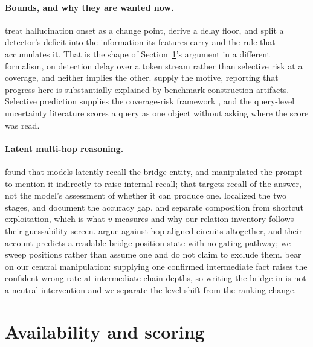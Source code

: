 \documentclass{article}
\begin{document}
\paragraph{Bounds, and why they are wanted now.} \citet{quickest2026onset} treat hallucination onset
as a change point, derive a delay floor, and split a detector's deficit into the information its
features carry and the rule that accumulates it. That is the shape of Section~\ref{sec:theory}'s
argument in a different formalism, on detection delay over a token stream rather than selective risk
at a coverage, and neither implies the other. \citet{hussain2026parallax} supply the motive, reporting
that progress here is substantially explained by benchmark construction artifacts. Selective
prediction supplies the coverage-risk framework
\citep{elyaniv2010foundations,geifman2017selective,chow1970optimum}, and the query-level uncertainty
literature
\citep{kadavath2022know,azaria2023internal,burns2023discovering,chen2024inside,ji2024internal,gottesman2024estimating,kossen2024semantic,chen2026querylevel,wen2025abstention,yao2025seakr}
scores a query as one object without asking where the score was read.

\paragraph{Latent multi-hop reasoning.} \citet{yang2024latent} found that models latently recall the
bridge entity, and manipulated the prompt to mention it indirectly to raise internal recall; that
targets recall of the answer, not the model's assessment of whether it can produce one.
\citet{biran2024hopping} localized the two stages, \citet{balesni2024twohop} and
\citet{press2023compositionality} document the accuracy gap, and \citet{yang2024shortcuts} separate
composition from shortcut exploitation, which is what $v$ measures and why our relation inventory
follows their guessability screen. \citet{layerorder2026} argue against hop-aligned circuits
altogether, and their account predicts a readable bridge-position state with no gating pathway; we
sweep positions rather than assume one and do not claim to exclude them.
\citet{lathkar2026anchored} bear on our central manipulation: supplying one confirmed intermediate
fact raises the confident-wrong rate at intermediate chain depths, so writing the bridge in is not a
neutral intervention and we separate the level shift from the ranking change.

\section{Availability and scoring}
\label{sec:theory}
\end{document}
